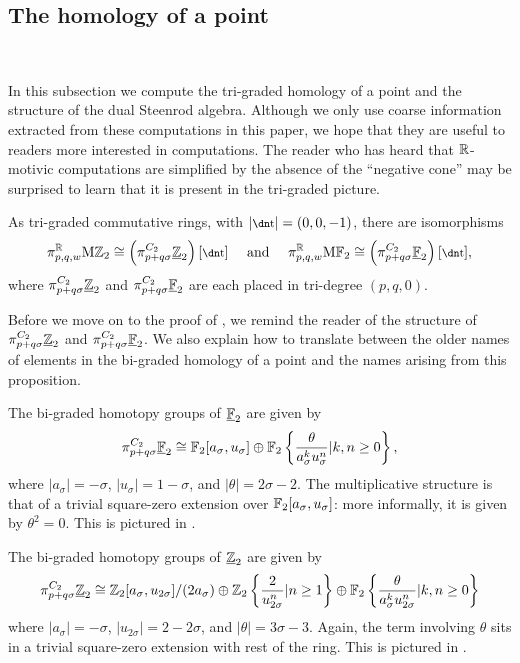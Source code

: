 \subsection{The homology of a point}\ 

In this subsection we compute the tri-graded homology of a point and the structure of the dual Steenrod algebra. Although we only use coarse information extracted from these computations in this paper, we hope that they are useful to readers more interested in computations. The reader who has heard that $\mathbb{R}$-motivic computations are simplified by the absence of the ``negative cone'' may be surprised to learn that it is present in the tri-graded picture.

\begin{prop} \label{thm:pthomology}
As tri-graded commutative rings, with $|\ta|=(0,0,-1)$, there are isomorphisms
\[ \pi^{\R}_{p,q,w} \HZt \cong \left(\pi^{C_2}_{p+q\sigma}\uZt\right)[\ta] \quad \text{ and } \quad \pi^{\R}_{p,q,w} \HFt \cong \left(\pi^{C_2}_{p+q\sigma}\uFt\right)[\ta], \] 
where $\pi_{p+q\sigma} ^{C_2} \underline{\mathbb{Z}}_{2}$ and $\pi_{p+q\sigma} ^{C_2} \underline{\mathbb{F}}_2$ are each placed in tri-degree $(p,q,0)$.
\end{prop}

Before we move on to the proof of ,
we remind the reader of the structure of $\pi_{p+q\sigma} ^{C_2} \underline{\mathbb{Z}}_{2}$ and $\pi_{p+q\sigma} ^{C_2} \underline{\mathbb{F}}_2$.
We also explain how to translate between the older names of elements in the bi-graded homology of a point and the names arising from this proposition.

\begin{rec} \label{thm:eqpthom} 
  The bi-graded homotopy groups of $\underline{\mathbb{F}}_2$ are given by
  \[\pi_{p+q\sigma} ^{C_2} \underline{\mathbb{F}}_2 \cong \operatorname{\mathbb{F}}_2 [a_\sigma, u_{\sigma}] \oplus \operatorname{\mathbb{F}}_2 \left\{ \frac{\theta}{a_\sigma ^k u_{\sigma} ^{n}} \vert k,n \geq 0 \right\},\]
  where $|a_\sigma| = -\sigma$, $|u_{\sigma}| = 1-\sigma$, and $|\theta| = 2\sigma - 2$.
   The multiplicative structure is that of a trivial square-zero extension over $\operatorname{\mathbb{F}}_2 [a_\sigma, u_\sigma]$: more informally, it is given by $\theta^2 = 0$.
  This is pictured in .
  
  The bi-graded homotopy groups of $\underline{\mathbb{Z}}_{2}$ are given by
  \[\pi_{p+q\sigma} ^{C_2} \underline{\mathbb{Z}}_{2} \cong \mathbb{Z}_2 [a_\sigma,u_{2\sigma}]/(2a_\sigma) \oplus \mathbb{Z}_2 \left\{ \frac{2}{u_{2\sigma} ^{n}} \vert n \geq 1 \right\} \oplus \operatorname{\mathbb{F}}_2 \left\{ \frac{\theta}{a_\sigma ^k u_{2\sigma} ^{n}} \vert k,n \geq 0 \right\}\]
  where $|a_\sigma| = -\sigma$, $|u_{2\sigma}| = 2-2\sigma$, and $|\theta| = 3\sigma - 3$.
  Again, the term involving $\theta$ sits in a trivial square-zero extension with rest of the ring.
  This is pictured in .
\end{rec}

